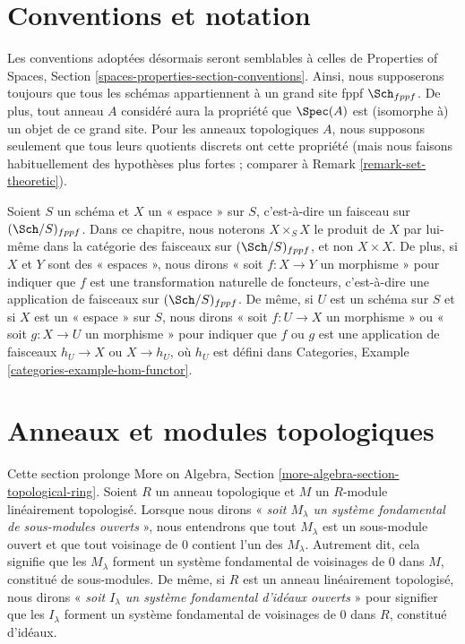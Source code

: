 \section{Conventions et notation}
\label{section-conventions}

\noindent
Les conventions adoptées désormais seront semblables à celles de
Properties of Spaces, Section \ref{spaces-properties-section-conventions}.
Ainsi, nous supposerons toujours que tous les schémas appartiennent
à un grand site fppf $\Sch_{fppf}$. De plus, tout anneau $A$ considéré aura la
propriété que $\Spec(A)$ est (isomorphe à) un objet de ce grand site.
Pour les anneaux topologiques $A$, nous supposons seulement que tous leurs quotients discrets ont
cette propriété (mais nous faisons habituellement des hypothèses plus fortes ; comparer à
Remark \ref{remark-set-theoretic}).

\medskip\noindent
Soient $S$ un schéma et $X$ un « espace » sur $S$, c'est-à-dire un faisceau sur
$(\Sch/S)_{fppf}$. Dans ce chapitre, nous noterons $X \times_S X$ le
produit de $X$ par lui-même dans la catégorie des faisceaux sur $(\Sch/S)_{fppf}$,
et non $X \times X$. De plus, si $X$ et $Y$ sont des « espaces »,
nous dirons « soit $f : X \to Y$ un morphisme » pour indiquer que $f$ est une
transformation naturelle de foncteurs, c'est-à-dire une application de faisceaux sur
$(\Sch/S)_{fppf}$. De même, si $U$ est un schéma sur $S$ et si
$X$ est un « espace » sur $S$, nous dirons
« soit $f : U \to X$ un morphisme » ou
« soit $g : X \to U$ un morphisme » pour indiquer que $f$ ou $g$
est une application de faisceaux $h_U \to X$ ou $X \to h_U$, où $h_U$ est défini dans
Categories, Example \ref{categories-example-hom-functor}.






\section{Anneaux et modules topologiques}
\label{section-topological-module}

\noindent
Cette section prolonge
More on Algebra, Section \ref{more-algebra-section-topological-ring}.
Soient $R$ un anneau topologique et $M$ un $R$-module linéairement topologisé.
Lorsque nous dirons « {\it soit $M_\lambda$ un système fondamental de
sous-modules ouverts} », nous entendrons que tout $M_\lambda$ est un sous-module ouvert
et que tout voisinage de $0$ contient l'un des $M_\lambda$.
Autrement dit, cela signifie que les $M_\lambda$ forment un système fondamental
de voisinages de $0$ dans $M$, constitué de sous-modules.
De même, si $R$ est un anneau linéairement topologisé, nous dirons
« {\it soit $I_\lambda$ un système fondamental d'idéaux ouverts} »
pour signifier que les $I_\lambda$ forment un système fondamental
de voisinages de $0$ dans $R$, constitué d'idéaux.

